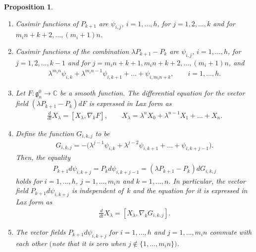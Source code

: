 \documentclass[pdftex]{sigma}
\numberwithin{equation}{section}
\newtheorem{Proposition}[Theorem]{Proposition}
 { \theoremstyle{definition}
\newtheorem{Example}[Theorem]{Example}}
\begin{document}
\begin{Proposition}\label{proposition2.3}\quad
\begin{enumerate}\itemsep=0pt
\item[$(i)$] Casimir functions of $P_{k+1}$ are $\psi_{i,j}$, $i=1,{\dots},h$, for $j=1,2,{\dots},k$ and for  $m_in+k+2,\dots ,(m_i+1)n$.

\item[$(ii)$] Casimir functions of the combination $\lambda P_{k+1} - P_k$ are $\psi_{i,j}$, $i=1,\dots ,h$, for $j=1,2,\dots ,k-1$ and for $j=m_in+k+1, m_in+k+2,\dots ,(m_i+1)n$, and
\begin{gather*}
\lambda ^{m_in}\psi_{i,k} + \lambda ^{m_in-1}\psi_{i, k+1}+ \dots +\psi_{i,m_in+k}, \qquad i=1,\dots ,h.
\end{gather*}
\item[$(iii)$] Let $F\colon \mathfrak{g}^0_n \to \mathbb{C}$ be a smooth function. The differential equation for the vector field $(\lambda P_{k+1} - P_k)dF$ is expressed in
Lax form as
\begin{gather*}
\frac{d}{dt}X_\lambda = [X_\lambda , \nabla _kF], \qquad X_\lambda =\lambda ^nX_0+\lambda ^{n-1}X_1+\dots +X_n.
\end{gather*}
\item[$(iv)$] Define the function $G_{i,k,j}$ to be
\begin{gather*}
G_{i,k,j} = -\big( \lambda ^{j-1}\psi_{i,k} + \lambda ^{j-2} \psi_{i,k+1} + \dots + \psi_{i,k+j-1}\big).
\end{gather*}
Then, the equality
\begin{gather*}
P_{k+1}d\psi_{i,k+j} = P_kd\psi_{i,k+j-1} = (\lambda P_{k+1}-P_k)dG_{i,k,j}
\end{gather*}
holds for $i=1,\dots ,h$, $j=1,\dots ,m_in$ and $k=1,\dots ,n$. In particular, the vector field $P_{k+1}d\psi_{i,k+j}$ is independent of~$k$ and the equation for it is expressed in Lax form as
\begin{gather*}
\frac{d}{dt}X_\lambda = [X_\lambda , \nabla _kG_{i,k,j}].
\end{gather*}
\item[$(v)$] The vector fields $P_{k+1}d\psi_{i,k+j}$ for $i=1,\dots ,h$ and $j=1,\dots , m_in$ commute with each other $($note that it is zero when $j\notin \{ 1,\dots ,m_in\})$.
\end{enumerate}
\end{Proposition}
\end{document}
